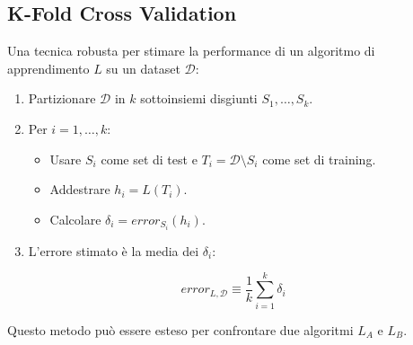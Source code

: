 \documentclass[a4paper,11pt]{article}
\begin{document}
\subsection{K-Fold Cross Validation}
Una tecnica robusta per stimare la performance di un algoritmo di apprendimento $L$ su un dataset $\mathcal{D}$:
\begin{enumerate}
    \item Partizionare $\mathcal{D}$ in $k$ sottoinsiemi disgiunti $S_1, \ldots, S_k$.
    \item Per $i=1, \ldots, k$:
    \begin{itemize}
        \item Usare $S_i$ come set di test e $T_i = \mathcal{D} \setminus S_i$ come set di training.
        \item Addestrare $h_i = L(T_i)$.
        \item Calcolare $\delta_i = error_{S_i}(h_i)$.
    \end{itemize}
    \item L'errore stimato è la media dei $\delta_i$:
\end{enumerate}

    \begin{equation}
    error_{L,\mathcal{D}} \equiv \frac{1}{k} \sum_{i=1}^k \delta_i
\end{equation}

Questo metodo può essere esteso per confrontare due algoritmi $L_A$ e $L_B$.
\end{document}
